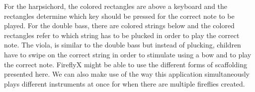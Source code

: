 For the harpsichord, the colored rectangles are above a keyboard and the rectangles determine which key should be pressed for the correct note to be played. For the double bass, there are colored strings below and the colored rectangles refer to which string has to be plucked in order to play the correct note. The viola, is similar to the double bass but instead of plucking, children have to swipe on the correct string in order to stimulate using a bow and to play the correct note. FireflyX might be able to use the different forms of scaffolding presented here. We can also make use of the way this application simultaneously plays different instruments at once for when there are multiple fireflies created.





